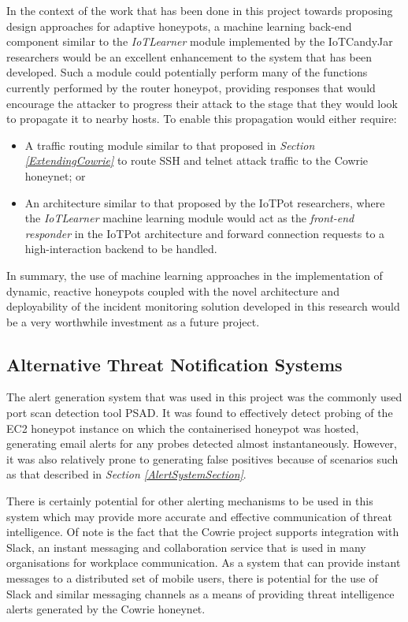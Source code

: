 In the context of the work that has been done in this project towards proposing design approaches for adaptive honeypots, a machine learning back-end component similar to the \textit{IoTLearner} module implemented by the IoTCandyJar researchers would be an excellent enhancement to the system that has been developed. \cite{IoTCandyJar} Such a module could potentially perform many of the functions currently performed by the router honeypot, providing responses that would encourage the attacker to progress their attack to the stage that they would look to propagate it to nearby hosts. To enable this propagation would either require:
\begin{itemize}
\item A traffic routing module similar to that proposed in \textit{Section \ref{ExtendingCowrie}} to route SSH and telnet attack traffic to the Cowrie honeynet; or
\item An architecture similar to that proposed by the IoTPot researchers, where the \textit{IoTLearner} machine learning module would act as the \textit{front-end responder} in the IoTPot architecture and forward connection requests to a high-interaction backend to be handled. \cite{IoTPot2016} \cite{IoTCandyJar} 
\end{itemize}

In summary, the use of machine learning approaches in the implementation of dynamic, reactive honeypots coupled with the novel architecture and deployability of the incident monitoring solution developed in this research would be a very worthwhile investment as a future project.


 
\subsection{Alternative Threat Notification Systems}
The alert generation system that was used in this project was the commonly used port scan detection tool PSAD. It was found to effectively detect probing of the EC2 honeypot instance on which the containerised honeypot was hosted, generating email alerts for any probes detected almost instantaneously. However, it was also relatively prone to generating false positives because of scenarios such as that described in \textit{Section \ref{AlertSystemSection}}.

There is certainly potential for other alerting mechanisms to be used in this system which may provide more accurate and effective communication of threat intelligence. Of note is the fact that the Cowrie project supports integration with Slack, an instant messaging and collaboration service that is used in many organisations for workplace communication. As a system that can provide instant messages to a distributed set of mobile users, there is potential for the use of Slack and similar messaging channels as a means of providing threat intelligence alerts generated by the Cowrie honeynet.

